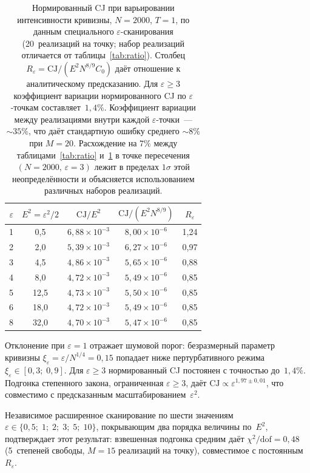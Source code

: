 \documentclass[12pt,a4paper]{article}
\theoremstyle{plain}
\theoremstyle{definition}
\theoremstyle{remark}
\newcommand{\CJ}{\mathrm{CJ}}
\begin{document}
\begin{table}[ht]
\centering
\caption{Нормированный CJ при варьировании интенсивности
кривизны, $N = 2000$, $T = 1$, по данным специального
$\varepsilon$-сканирования (20~реализаций на точку;
набор реализаций отличается от
таблицы~\ref{tab:ratio}).  Столбец
$R_\varepsilon = \CJ/(E^2 N^{8/9} C_0)$ даёт отношение к
аналитическому предсказанию.  Для $\varepsilon \geq 3$
коэффициент вариации нормированного CJ по
$\varepsilon$-точкам составляет~$1{,}4\%$.
Коэффициент вариации между реализациями внутри каждой
$\varepsilon$-точки~--- $\sim 35\%$, что даёт стандартную
ошибку среднего $\sim 8\%$ при $M = 20$.  Расхождение на
$7\%$ между таблицами~\ref{tab:ratio} и~\ref{tab:epsilon}
в точке пересечения $(N = 2000,\, \varepsilon = 3)$ лежит
в пределах $1\sigma$ этой неопределённости и объясняется
использованием различных наборов реализаций.}
\label{tab:epsilon}
\begin{tabular}{rcccc}
\toprule
$\varepsilon$ & $E^2 = \varepsilon^2/2$
& $\CJ/E^2$ & $\CJ / (E^2 N^{8/9})$ & $R_\varepsilon$ \\
\midrule
1 &  0,5 & $6{,}88 \times 10^{-3}$ & $8{,}00 \times 10^{-6}$ & 1,24 \\
2 &  2,0 & $5{,}39 \times 10^{-3}$ & $6{,}27 \times 10^{-6}$ & 0,97 \\
3 &  4,5 & $4{,}86 \times 10^{-3}$ & $5{,}65 \times 10^{-6}$ & 0,88 \\
4 &  8,0 & $4{,}72 \times 10^{-3}$ & $5{,}49 \times 10^{-6}$ & 0,85 \\
5 & 12,5 & $4{,}73 \times 10^{-3}$ & $5{,}50 \times 10^{-6}$ & 0,85 \\
6 & 18,0 & $4{,}72 \times 10^{-3}$ & $5{,}49 \times 10^{-6}$ & 0,85 \\
8 & 32,0 & $4{,}70 \times 10^{-3}$ & $5{,}47 \times 10^{-6}$ & 0,85 \\
\bottomrule
\end{tabular}
\end{table}

Отклонение при $\varepsilon = 1$ отражает шумовой порог:
безразмерный параметр кривизны
$\xi_{\varepsilon} = \varepsilon / N^{1/4} = 0{,}15$ попадает
ниже пертурбативного режима
$\xi_{\varepsilon} \in [0{,}3;\; 0{,}9]$.  Для
$\varepsilon \geq 3$ нормированный CJ постоянен с точностью
до~$1{,}4\%$.  Подгонка степенного закона, ограниченная
$\varepsilon \geq 3$, даёт
$\CJ \propto \varepsilon^{1{,}97 \pm 0{,}01}$, что совместимо
с предсказанным масштабированием~$\varepsilon^2$.

Независимое расширенное сканирование по шести значениям
$\varepsilon \in \{0{,}5;\; 1;\; 2;\; 3;\; 5;\; 10\}$,
покрывающим два порядка величины по~$E^2$, подтверждает
этот результат: взвешенная подгонка средним даёт
$\chi^2/\mathrm{dof} = 0{,}48$ (5~степеней свободы,
$M = 15$ реализаций на точку), совместимое с
постоянным~$R_\varepsilon$.
\end{document}
